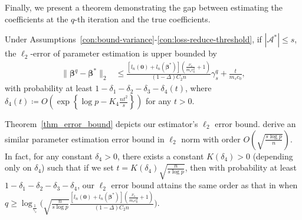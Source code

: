 Finally, we present a theorem demonstrating the gap between estimating the coefficients at the $q$-th iteration and the true coefficients.
\begin{theorem}\label{thm_error_bound}
Under Assumptions~\ref{con:bound-variance}-\ref{con:loss-reduce-threshold},
if $| \mathcal{A}^* | \leq s$, the $\ell_2$-error of parameter estimation is upper bounded by
\begin{align*}
\|\boldsymbol \beta^q-\boldsymbol \beta^{*}\|_{2} & \leq \frac{\left[l_n(\boldsymbol 0) + l_n(\boldsymbol\beta^*)\right]\left(\frac{\nu_s}{m_sc_0^2}+1\right)}{(1-\Delta)C_{2}n}\gamma_{s}^q + \frac{t}{m_s c_0},
\end{align*}
with probability at least $1- \delta_{1}-\delta_{2}-\delta_{3} - \delta_{4}(t)$, where
$\delta_{4}(t) \coloneqq O\left(\exp\left\{\log p - K_4\frac{nt^2}{s}\right\}\right)$ for any $t>0$. %
\end{theorem}
Theorem~\ref{thm_error_bound} depicts our estimator's $\ell_2$ error bound.
\citet{li2017quadratic} derive an similar parameter estimation error bound in $\ell_2$ norm with order $O(\sqrt{\frac{s\log p}{n}})$.
In fact, for any constant $\delta_4>0$, there exists a constant $K(\delta_4)>0$ (depending only on $\delta_4$) such that if we set $t = K(\delta_4)\sqrt{\frac{n}{s\log p}}$,
then with probability at least $1-\delta_{1}-\delta_{2}-\delta_{3} - \delta_{4}$, our $\ell_2$ error bound attains the same order as that in \citet{li2017quadratic}
when $q\geq \log_{\frac{1}{\gamma_s}} \Big( \sqrt{\frac{n}{s\log p}} \frac{\left[l_n(\boldsymbol 0) + l_n(\boldsymbol\beta^*)\right]\left(\frac{\nu_s}{m_sc_0^2}+1\right)}{(1-\Delta)C_{2}n} \Big)$.


